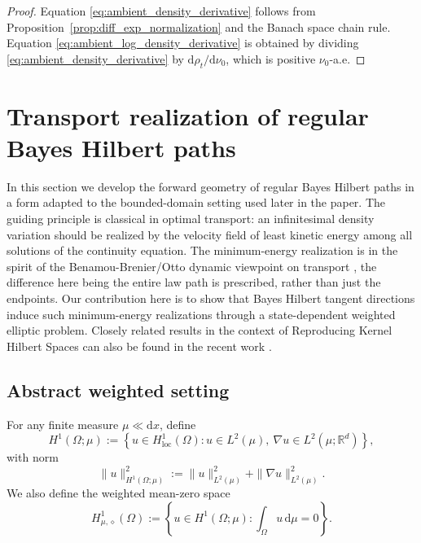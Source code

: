 \documentclass{article}
\theoremstyle{definition}
\newtheorem{remark}[theorem]{Remark}
\renewcommand{\d}{\mathrm{d}}
\begin{document}
\begin{proof}
    Equation \eqref{eq:ambient_density_derivative} follows from Proposition~\ref{prop:diff_exp_normalization} and the Banach space chain rule.
    Equation \eqref{eq:ambient_log_density_derivative} is obtained by dividing \eqref{eq:ambient_density_derivative} by \(\d\rho_t/\d\nu_0\), which is positive \(\nu_0\)-a.e.
\end{proof}



\section{Transport realization of regular Bayes Hilbert paths}
\label{sec:intrinsic-forward-geometry}

In this section we develop the forward geometry of regular Bayes Hilbert paths in a form
adapted to the bounded-domain setting used later in the paper. The guiding principle is classical
in optimal transport: an infinitesimal density variation should be realized by the velocity field of
least kinetic energy among all solutions of the continuity equation. The minimum-energy realization is in the spirit of the Benamou-Brenier/Otto dynamic viewpoint on transport \citep{villaniOptimalTransport2009}, the difference here being the entire law path is prescribed, rather than just the endpoints.
Our contribution here is to show that Bayes Hilbert tangent directions induce such minimum-energy realizations through a state-dependent weighted elliptic problem.  Closely related results in the context of Reproducing Kernel Hilbert Spaces can also be found in the recent work \citet{Nakano2026ContinuumMarginal}.

\subsection{Abstract weighted setting}

For any finite measure \(\mu\ll \d x\), define
\[
    H^1(\Omega;\mu)
    :=
    \left\{
    u\in H^1_{\mathrm{loc}}(\Omega):
    u\in L^2(\mu),\ \nabla u\in L^2(\mu;\mathbb R^d)
    \right\},
\]
with norm
\[
    \|u\|_{H^1(\Omega;\mu)}^2
    :=
    \|u\|_{L^2(\mu)}^2+\|\nabla u\|_{L^2(\mu)}^2.
\]
We also define the weighted mean-zero space
\[
    H^1_{\mu,\diamond}(\Omega)
    :=
    \left\{
    u\in H^1(\Omega;\mu): \int_\Omega u\,\d\mu =0
    \right\}.
\]
\end{document}
